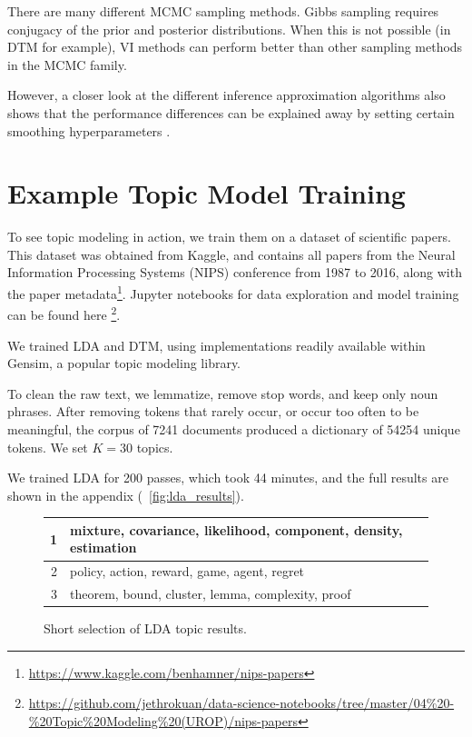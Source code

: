 \documentclass[letterpaper]{article}
\begin{document}
There are many different MCMC sampling methods. Gibbs sampling
requires conjugacy of the prior and posterior distributions. When this
is not possible (in DTM for example), VI methods can perform better
than other sampling methods in the MCMC family.

However, a closer look at the different inference approximation
algorithms also shows that the performance differences can be
explained away by setting certain smoothing hyperparameters
\cite{asuncion-2012-smoot-infer}.

\section{Example Topic Model Training}
To see topic modeling in action, we train them on a dataset of
scientific papers. This dataset was obtained from Kaggle, and contains
all papers from the Neural Information Processing Systems (NIPS)
conference from 1987 to 2016, along with the paper
metadata\footnote{\url{https://www.kaggle.com/benhamner/nips-papers}}.
Jupyter notebooks for data exploration and model training can be found
here
\footnote{\url{https://github.com/jethrokuan/data-science-notebooks/tree/master/04\%20-\%20Topic\%20Modeling\%20(UROP)/nips-papers}}.

We trained LDA and DTM, using implementations readily available within
Gensim, a popular topic modeling library.

To clean the raw text, we lemmatize, remove stop words, and keep only
noun phrases. After removing tokens that rarely occur, or occur too often
to be meaningful, the corpus of 7241 documents produced a dictionary
of 54254 unique tokens. We set $K = 30$ topics.

We trained LDA for 200 passes, which took 44 minutes, and the full
results are shown in the appendix (~\autoref{fig:lda_results}).

\begin{figure}[ht]
  \begin{tabularx}{\linewidth}{|r | X|}
    \hline
    1 & mixture, covariance, likelihood, component, density, estimation \\ \hline
    2 & policy, action, reward, game, agent, regret \\ \hline
    3 & theorem, bound, cluster, lemma, complexity, proof \\ \hline
  \end{tabularx}
  \caption{\label{fig:lda_trunc} Short selection of LDA topic results.}
\end{figure}
\end{document}

